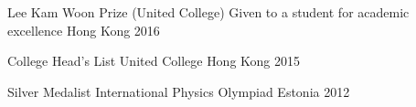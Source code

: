 



\begin{cvhonors}

  \cvhonor
    {Lee Kam Woon Prize (United College)} %
    {Given to a student for academic excellence} %
    {Hong Kong} %
    {2016} %

  \cvhonor
    {College Head's List} %
    {United College} %
    {Hong Kong} %
    {2015} %


  \cvhonor
    {Silver Medalist} %
    {International Physics Olympiad} %
    {Estonia} %
    {2012} %

\end{cvhonors}
